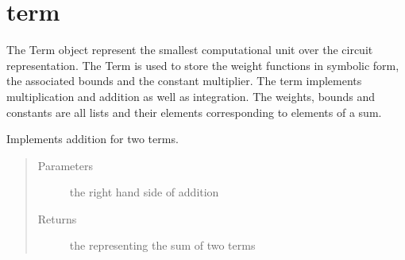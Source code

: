 \documentclass[letterpaper,10pt,english,openany,oneside]{sphinxmanual}
\begin{document}
\section{term}
\label{\detokenize{index:module-term}}\label{\detokenize{index:term}}\label{\detokenize{index:module-1}}

\begin{fulllineitems}
\label{\detokenize{index:term.Term}}
The Term object represent the smallest computational unit over the circuit representation. The Term is used to store the weight
functions in symbolic form, the associated bounds and the constant multiplier. The term implements multiplication and addition as well
as integration. The weights, bounds and constants are all lists and their elements corresponding to elements of a sum.

\begin{fulllineitems}
\label{\detokenize{index:term.Term.__add__}}
Implements addition for two terms.
\begin{quote}\begin{description}
\item[{Parameters}] \leavevmode
{} \textendash{} the right hand side {\hyperref[\detokenize{index:term.Term}]{}} of addition

\item[{Returns}] \leavevmode
the {\hyperref[\detokenize{index:term.Term}]{}} representing the sum of two terms

\end{description}\end{quote}


\end{fulllineitems}
\end{fulllineitems}
\end{document}
